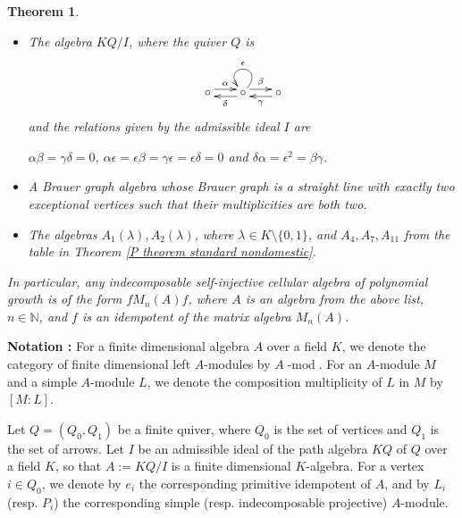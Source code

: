 \documentclass[12pt]{amsart}
\newtheorem{THEOREM}{Theorem}
\numberwithin{equation}{thm}
\newcommand\NN{\mathbb N}
\newcommand\la{\lambda}
\newcommand\cmod{\operatorname{-mod}}
\newcounter{ni}
\newcounter{go}
\begin{document}
\begin{THEOREM}
\begin{itemize}
\begin{itemize}
\item[(a)]
$\alpha\beta\gamma\delta\alpha=\beta\gamma\delta\alpha\beta=\gamma\delta\alpha\beta\gamma=\delta\alpha\beta\gamma\delta=0$, 
$\gamma\beta=0$, $\alpha\delta\alpha=\alpha\beta\gamma$ and $\delta\alpha\delta=\beta\gamma\delta$.
\item[(b)]
$\alpha(\delta\alpha)^2=\gamma(\delta\alpha)^2=0$, $(\delta\alpha)^2\delta=(\delta\alpha)^2\beta=0$, 
$\alpha\delta\alpha\beta=0$, $\gamma\beta\gamma\delta=0$ and $\delta\alpha=\beta\gamma$.
\end{itemize}
\item[(5)]
The algebra $KQ/I$, where the quiver $Q$ is
\[
\begin{xy}
(0,0) *[o]+{\circ}="A", (10,0) *[o]+{\circ}="B", (20,0) *[o]+{\circ}="C",
\ar @<1mm> "A";"B"^{\alpha}
\ar @<1mm> "B";"C"^{\beta}
\ar @<1mm> "B";"A"^{\delta}
\ar @<1mm> "C";"B"^{\gamma}
\ar @(ru,lu) "B";"B"_{\epsilon}
\end{xy}
\]
and the relations given by the admissible ideal $I$ are
\begin{center}
$\alpha\beta=\gamma\delta=0$, $\alpha\epsilon=\epsilon\beta=\gamma\epsilon=\epsilon\delta=0$ and $\delta\alpha=\epsilon^2=\beta\gamma$.
\end{center}
\item[(6)]
A Brauer graph algebra whose Brauer graph is a straight line with exactly two exceptional vertices such that 
their multiplicities are both two.
\item[(7)]
The algebras $A_1(\la), A_2(\la)$, where $\la\in K\setminus\{0,1\}$, and $A_4, A_7, A_{11}$ 
from the table in Theorem \ref{P theorem standard nondomestic}.
\end{itemize}

In particular, any indecomposable self-injective cellular algebra of polynomial growth is of the form $fM_n(A)f$, 
where $A$ is an algebra from the above list, $n\in\NN$, and $f$ is an idempotent of the matrix algebra $M_n(A)$.
\end{THEOREM}

\medskip
{\bf Notation :} 
For a finite dimensional algebra $A$ over a field $K$, 
we denote  the category of finite dimensional left $A$-modules by $A \cmod$. 
For an $A$-module $M$ and a simple $A$-module $L$, 
we denote the composition multiplicity of $L$ in $M$ by $[M:L]$. 

Let $Q =(Q_0,Q_1)$ be a finite quiver, 
where $Q_0$ is the set of vertices and $Q_1$ is the set of arrows. 
Let $I$ be an admissible ideal of the path algebra $K Q$ of $Q$ over a field $K$, so that $A:=K Q/I$ is a finite dimensional $K$-algebra.
For a vertex $i \in Q_0$, we denote by $e_i$ the corresponding primitive idempotent of $A$, 
and by $L_i$ (resp. $P_i$) the corresponding simple (resp. indecomposable projective) $A$-module.  
\end{document}
